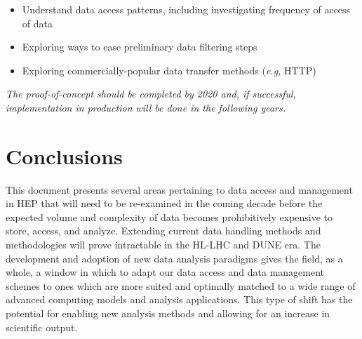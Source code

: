 \documentclass[12pt,a4paper]{article}
\begin{document}
\begin{itemize}
\item Understand data access patterns, including investigating frequency of access of data
\item Exploring ways to ease preliminary data filtering steps
\item Exploring commercially-popular data transfer methods (\emph{e.g,} HTTP)
\end{itemize}
\emph{The  proof-of-concept should be completed by 2020 and, if successful, implementation in
production will be done in the following years.}

\section{Conclusions}\label{conclusions}

This document presents several
areas pertaining to data access and management in HEP that will need to
be re-examined in the coming decade before the expected volume and
complexity of data becomes prohibitively expensive to store, access, and
analyze. Extending current data handling methods and methodologies will
prove intractable in the HL-LHC and DUNE era. The development and
adoption of new data analysis paradigms gives the field, as a whole, a
window in which to adapt our data access and data management schemes to
ones which are more suited and optimally matched to a wide range of
advanced computing models and analysis applications. This type of shift
has the potential for enabling new analysis methods and allowing for an
increase in scientific output.


\sloppy
\raggedright
\clearpage
\printbibliography[title={References},heading=bibintoc]
\end{document}
